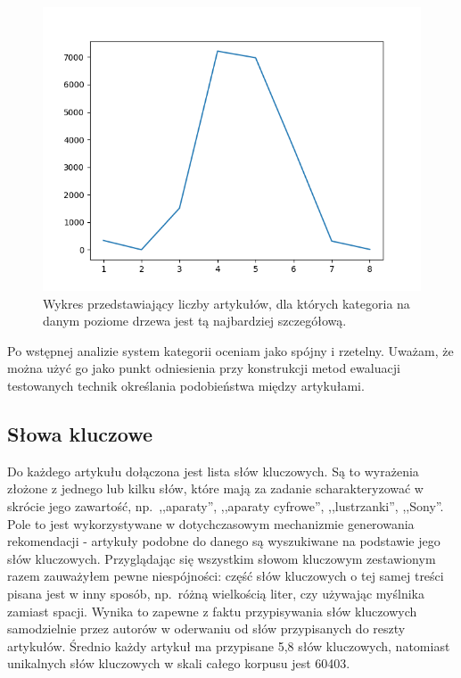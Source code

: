 \documentclass[pl]{minipw} %
\begin{document}
\begin{figure}[H]
	\centering
	\includegraphics[width=1\textwidth]{img/cat_art_levels.png}
	\caption{Wykres przedstawiający liczby artykułów, dla których kategoria na danym poziome drzewa jest tą najbardziej szczegółową.}
\end{figure}
Po wstępnej analizie system kategorii oceniam jako spójny i rzetelny. Uważam, że można użyć go jako punkt odniesienia przy konstrukcji metod ewaluacji testowanych technik określania podobieństwa między artykułami.
\subsection{Słowa kluczowe}
Do każdego artykułu dołączona jest lista słów kluczowych. Są to wyrażenia złożone z jednego lub kilku słów, które mają za zadanie scharakteryzować w skrócie jego zawartość, np.~,,aparaty'', ,,aparaty cyfrowe'', ,,lustrzanki'', ,,Sony''. Pole to jest wykorzystywane w dotychczasowym mechanizmie generowania rekomendacji - artykuły podobne do danego są wyszukiwane na podstawie jego słów kluczowych. Przyglądając się wszystkim słowom kluczowym zestawionym razem zauważyłem pewne niespójności: część słów kluczowych o tej samej treści pisana jest w inny sposób, np.~różną wielkością liter, czy używając myślnika zamiast spacji. Wynika to zapewne z faktu przypisywania słów kluczowych samodzielnie przez autorów w oderwaniu od słów przypisanych do reszty artykułów. Średnio każdy artykuł ma przypisane 5,8 słów kluczowych, natomiast unikalnych słów kluczowych w skali całego korpusu jest 60403.
\end{document}
